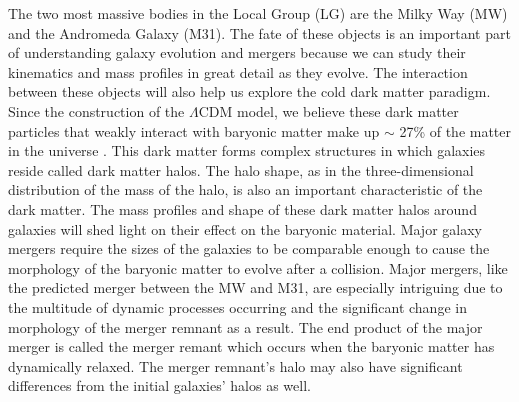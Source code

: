 \documentclass[linenumbers, twocolumn]{aastex631}
\begin{document}
The two most massive bodies in the Local Group (LG) are the Milky Way (MW) and the Andromeda Galaxy (M31). The fate of these objects is an important part of understanding galaxy evolution and mergers because we can study their kinematics and mass profiles in great detail as they evolve. 
The interaction between these objects will also help us explore the cold dark matter paradigm. Since the construction of the $\Lambda$CDM model, we believe these dark matter particles that weakly interact with baryonic matter make up $\sim$ 27\% of the matter in the universe \citep{2014LCDM}. This dark matter forms complex structures in which galaxies reside called dark matter halos. 
The halo shape, as in the three-dimensional distribution of the mass of the halo, is also an important characteristic of the dark matter.
The mass profiles and shape of these dark matter halos around galaxies will shed light on their effect on the baryonic material.
Major galaxy mergers require the sizes of the galaxies to be comparable enough to cause the morphology of the baryonic matter to evolve after a collision.
Major mergers, like the predicted merger between the MW and M31, are especially intriguing due to the multitude of dynamic processes occurring and the significant change in morphology of the merger remnant as a result. 
The end product of the major merger is called the merger remant which occurs when the baryonic matter has dynamically relaxed.
The merger remnant's halo may also have significant differences from the initial galaxies' halos as well.

\end{document}
